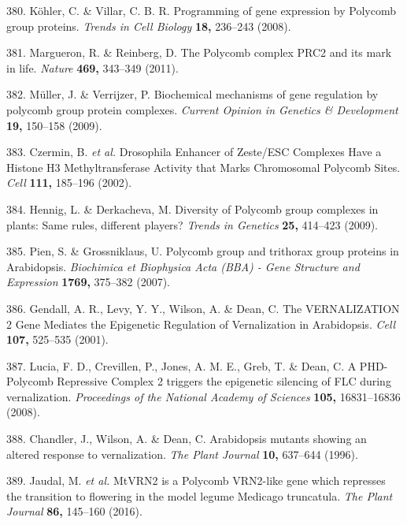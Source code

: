 \documentclass[12pt,]{book}
\begin{document}
\hypertarget{ref-kohler_programming_2008}{}
380. Köhler, C. \& Villar, C. B. R. Programming of gene expression by
Polycomb group proteins. \emph{Trends in Cell Biology} \textbf{18,}
236--243 (2008).

\hypertarget{ref-margueron_polycomb_2011}{}
381. Margueron, R. \& Reinberg, D. The Polycomb complex PRC2 and its
mark in life. \emph{Nature} \textbf{469,} 343--349 (2011).

\hypertarget{ref-muller_biochemical_2009}{}
382. Müller, J. \& Verrijzer, P. Biochemical mechanisms of gene
regulation by polycomb group protein complexes. \emph{Current Opinion in
Genetics \& Development} \textbf{19,} 150--158 (2009).

\hypertarget{ref-czermin_drosophila_2002}{}
383. Czermin, B. \emph{et al.} Drosophila Enhancer of Zeste/ESC
Complexes Have a Histone H3 Methyltransferase Activity that Marks
Chromosomal Polycomb Sites. \emph{Cell} \textbf{111,} 185--196 (2002).

\hypertarget{ref-hennig_diversity_2009}{}
384. Hennig, L. \& Derkacheva, M. Diversity of Polycomb group complexes
in plants: Same rules, different players? \emph{Trends in Genetics}
\textbf{25,} 414--423 (2009).

\hypertarget{ref-pien_polycomb_2007}{}
385. Pien, S. \& Grossniklaus, U. Polycomb group and trithorax group
proteins in Arabidopsis. \emph{Biochimica et Biophysica Acta (BBA) -
Gene Structure and Expression} \textbf{1769,} 375--382 (2007).

\hypertarget{ref-gendall_vernalization_2001}{}
386. Gendall, A. R., Levy, Y. Y., Wilson, A. \& Dean, C. The
VERNALIZATION 2 Gene Mediates the Epigenetic Regulation of Vernalization
in Arabidopsis. \emph{Cell} \textbf{107,} 525--535 (2001).

\hypertarget{ref-lucia_phd_polycomb_2008}{}
387. Lucia, F. D., Crevillen, P., Jones, A. M. E., Greb, T. \& Dean, C.
A PHD-Polycomb Repressive Complex 2 triggers the epigenetic silencing of
FLC during vernalization. \emph{Proceedings of the National Academy of
Sciences} \textbf{105,} 16831--16836 (2008).

\hypertarget{ref-chandler_arabidopsis_1996}{}
388. Chandler, J., Wilson, A. \& Dean, C. Arabidopsis mutants showing an
altered response to vernalization. \emph{The Plant Journal} \textbf{10,}
637--644 (1996).

\hypertarget{ref-jaudal_mtvrn2_2016}{}
389. Jaudal, M. \emph{et al.} MtVRN2 is a Polycomb VRN2-like gene which
represses the transition to flowering in the model legume Medicago
truncatula. \emph{The Plant Journal} \textbf{86,} 145--160 (2016).
\end{document}
